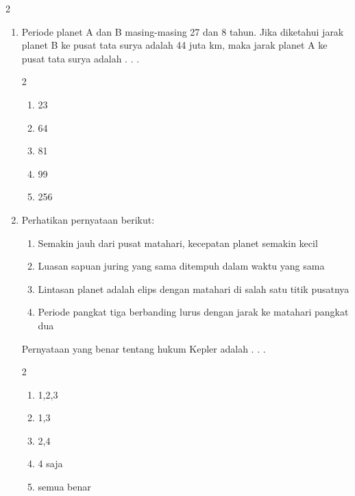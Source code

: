 \documentclass[11pt,a4paper]{article}
\newcommand*\pernyataan[1]{
\begin{enumerate}[label=(\arabic*), itemsep=0pt,topsep=0pt,leftmargin=*] #1 
\end{enumerate}}
\newcommand{\pilgani}[1]{                            \vspace{-0.3cm}\begin{multicols}{2}
 \begin{enumerate}[label=\Alph*., itemsep=0pt,topsep=0pt,leftmargin=*,align=Center]#1                     \end{enumerate}
 \phantom{ini cuma sapi, wedus, dan ayam}
 \end{multicols}}
\newcommand{\spasi}{
    \vspace{-0.5cm}
\begin{tcolorbox} [boxrule=0.5pt,height=4.2cm, colback=white]

\end{tcolorbox}

}
\begin{document}
\begin{multicols*}{2}
\begin{enumerate}
\item Periode planet A dan B masing-masing 27 dan 8 tahun. Jika diketahui jarak planet B ke pusat tata surya adalah 44 juta km, maka jarak planet A ke pusat tata surya adalah . . . 
\pilgani{
    \item 23
    \item 64
    \item 81
    \item 99
    \item 256
}
\spasi

\item  Perhatikan pernyataan berikut:
\pernyataan{
    \item Semakin jauh dari pusat matahari, kecepatan planet semakin kecil
    \item Luasan sapuan juring yang sama ditempuh dalam waktu yang sama
    \item Lintasan planet adalah elips dengan matahari di salah satu titik pusatnya
    \item Periode pangkat tiga berbanding lurus dengan jarak ke matahari pangkat dua
}
Pernyataan yang benar tentang hukum Kepler adalah . . .
\pilgani{ 
    \item 1,2,3
    \item 1,3
    \item 2,4
    \item 4 saja
    \item semua benar
}



\end{enumerate}


\end{multicols*}
\end{document}
